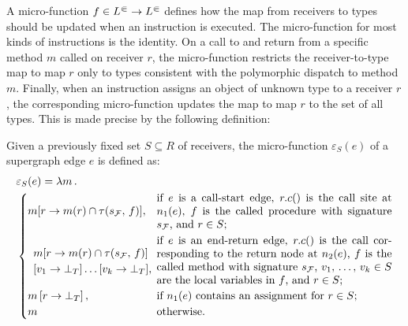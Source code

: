 
A micro-function $f\in L^\Subset\to L^\Subset$ defines how the map from receivers to types should
be updated when an instruction is executed.
The micro-function for most kinds of instructions is the identity.
On a call to and return from a specific method $m$ called on receiver $r$,
the micro-function restricts the receiver-to-type map to map $r$ only to
types consistent with the polymorphic dispatch to method $m$.
Finally, when an instruction assigns an object of unknown type to a receiver
$r$, the corresponding micro-function updates the map to map $r$ to the
set of all types. This is made precise by the following definition:
\begin{definition}\label{def:microfn}
Given a previously fixed set $S \subseteq R$ of receivers, the micro-function $\varepsilon_S(e)$
of a supergraph edge $e$ is defined as:
  \begin{align}\label{eq:varepsilon}
      &\varepsilon_S(e)= \lambda m\,.\,\\
        &\begin{cases}
            m[r\to m(r)\cap \tau(s_\mathcal F,\,f)],
            &\text{\parbox{75mm}{
                if $e$ is a call-start edge, $r.c()$ is
                the call site at $n_1(e)$, $f$ is the called
                procedure with signature $s_\mathcal F$,
                and $r\in S$;}}\\[3ex]
        \parbox{30mm}{\[\begin{array}{l}
                m[r\to m(r)\cap \tau(s_\mathcal F,\,f)]\\
            [v_1\to\bot_T] \ldots [v_k\to\bot_T],
        \end{array}
        \]
        }
        &
        \text{\parbox{75mm}{
                if $e$ is an end-return edge,
                $r.c()$ is the call
                corresponding to the return node
                at $n_2(e)$,
                $f$ is the called method with
                signature $s_\mathcal F$,
                $v_1,\,\dots,\,v_k\in S$ are the local variables
                in $f$,
                and $r\in S$;}}\\
            m\left[r\to \bot_T\right],
            &\text{\parbox{75mm}{if $n_1(e)$ contains an assignment
                    for $r\in S$;}}\\
            m
                &\text{otherwise.}
        \end{cases}
  \end{align}
\end{definition}

